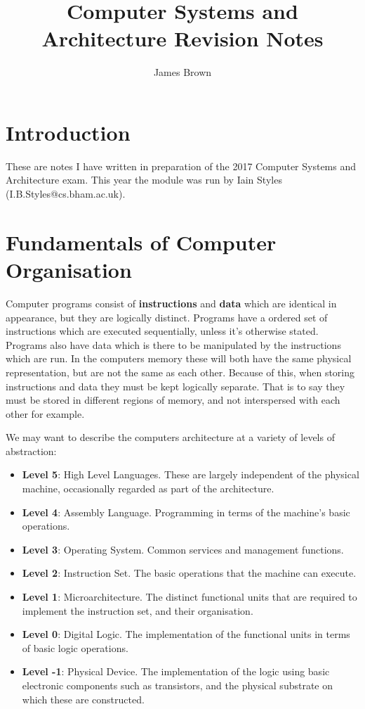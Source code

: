 \documentclass{article}
\title{Computer Systems and Architecture \linebreak Revision Notes}
\author{James Brown}
\begin{document}
	\maketitle
	\newpage
	\tableofcontents
	\newpage
	
	\section{Introduction}
	These are notes I have written in preparation of the 2017 Computer Systems and Architecture exam. This year the module was run by Iain Styles (I.B.Styles@cs.bham.ac.uk).
	
	\section{Fundamentals of Computer Organisation}
	Computer programs consist of \textbf{instructions} and \textbf{data} which are identical in appearance, but they are logically distinct. Programs have a ordered set of instructions which are executed sequentially, unless it's otherwise stated. Programs also have data which is there to be manipulated by the instructions which are run. In the computers memory these will both have the same physical representation, but are not the same as each other. Because of this, when storing instructions and data they must be kept logically separate. That is to say they must be stored in different regions of memory, and not interspersed with each other for example.
	
	\par 
	We may want to describe the computers architecture at a variety of levels of abstraction:
	\begin{itemize}
		\item \textbf{Level 5}: High Level Languages. These are largely independent of the physical machine, occasionally regarded as part of the architecture.
		\item \textbf{Level 4}: Assembly Language. Programming in terms of the machine's basic operations.
		\item \textbf{Level 3}: Operating System. Common services and management functions.
		\item \textbf{Level 2}: Instruction Set. The basic operations that the machine can execute.
		\item \textbf{Level 1}: Microarchitecture. The distinct functional units that are required to implement the instruction set, and their organisation.
		\item \textbf{Level 0}: Digital Logic. The implementation of the functional units in terms of basic logic operations.
		\item \textbf{Level -1}: Physical Device. The implementation of the logic using basic electronic components such as transistors, and the physical substrate on which these are constructed.
	\end{itemize}
	
\end{document}
